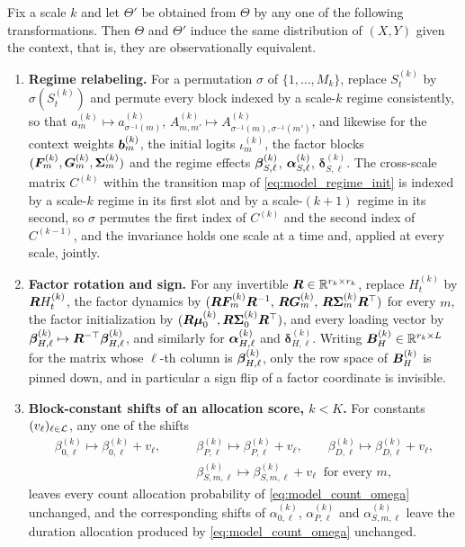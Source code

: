 \begin{proposition}
\label{prop:invariances}
Fix a scale $k$ and let $\Theta'$ be obtained from $\Theta$ by any one of the
following transformations. Then $\Theta$ and $\Theta'$ induce the same
distribution of $(X,Y)$ given the context, that is, they are observationally
equivalent.
\begin{enumerate}
\item \textbf{Regime relabeling.} For a permutation $\sigma$ of
$\{1,\dots,M_k\}$, replace $S_t^{(k)}$ by $\sigma(S_t^{(k)})$ and permute every
block indexed by a scale-$k$ regime consistently, so that $a_m^{(k)} \mapsto
a_{\sigma^{-1}(m)}^{(k)}$, $A_{m,m'}^{(k)} \mapsto
A_{\sigma^{-1}(m),\sigma^{-1}(m')}^{(k)}$, and likewise for the context weights
${\bm{b}}_m^{(k)}$, the initial logits $\iota_m^{(k)}$, the factor blocks
$({\bm{F}}_m^{(k)}, {\bm{G}}_m^{(k)}, {\boldsymbol{\Sigma}}_m^{(k)})$ and the regime effects
${\boldsymbol{\beta}}_{S,\ell}^{(k)}$, ${\boldsymbol{\alpha}}_{S,\ell}^{(k)}$,
$\boldsymbol{\delta}_{S,\ell}^{(k)}$. The cross-scale matrix $C^{(k)}$ within
the transition map of \cref{eq:model_regime_init} is indexed by a scale-$k$ regime in its first slot
and by a scale-$(k+1)$ regime in its second, so $\sigma$ permutes the first
index of $C^{(k)}$ and the second index of $C^{(k-1)}$, and the invariance
holds one scale at a time and, applied at every scale, jointly.

\item \textbf{Factor rotation and sign.} For any invertible
${\bm{R}} \in {\mathbb{R}}^{r_k \times r_k}$, replace $H_t^{(k)}$ by ${\bm{R}} H_t^{(k)}$, the
factor dynamics by $({\bm{R}} {\bm{F}}_m^{(k)} {\bm{R}}^{-1}, \, {\bm{R}} {\bm{G}}_m^{(k)}, \,
{\bm{R}} {\boldsymbol{\Sigma}}_m^{(k)} {\bm{R}}^\top)$ for every $m$, the factor initialization by
$({\bm{R}} {\boldsymbol{\mu}}_0^{(k)}, {\bm{R}} {\boldsymbol{\Sigma}}_0^{(k)} {\bm{R}}^\top)$, and every loading vector by
${\boldsymbol{\beta}}_{H,\ell}^{(k)} \mapsto {\bm{R}}^{-\top} {\boldsymbol{\beta}}_{H,\ell}^{(k)}$, and
similarly for ${\boldsymbol{\alpha}}_{H,\ell}^{(k)}$ and $\boldsymbol{\delta}_{H,\ell}^{(k)}$.
Writing ${\bm{B}}_H^{(k)} \in {\mathbb{R}}^{r_k \times L}$ for the matrix whose $\ell$-th
column is ${\boldsymbol{\beta}}_{H,\ell}^{(k)}$, only the row space of ${\bm{B}}_H^{(k)}$ is
pinned down, and in particular a sign flip of a factor coordinate is invisible.

\item \textbf{Block-constant shifts of an allocation score, $k < K$.} For
constants $(v_\ell)_{\ell \in {\mathcal{L}}}$, any one of the shifts
\begin{align*}
\beta_{0,\ell}^{(k)} \mapsto \beta_{0,\ell}^{(k)} + v_\ell,
\qquad
&\beta_{P,\ell}^{(k)} \mapsto \beta_{P,\ell}^{(k)} + v_\ell,
\qquad
\beta_{D,\ell}^{(k)} \mapsto \beta_{D,\ell}^{(k)} + v_\ell,
\\
&\beta_{S,m,\ell}^{(k)} \mapsto \beta_{S,m,\ell}^{(k)} + v_\ell
\;\;\text{for every } m,
\end{align*}
leaves every count allocation probability of \cref{eq:model_count_omega}
unchanged, and the corresponding shifts of $\alpha_{0,\ell}^{(k)}$,
$\alpha_{P,\ell}^{(k)}$ and $\alpha_{S,m,\ell}^{(k)}$ leave the duration
allocation produced by \cref{eq:model_count_omega} unchanged.


\end{enumerate}
\end{proposition}
